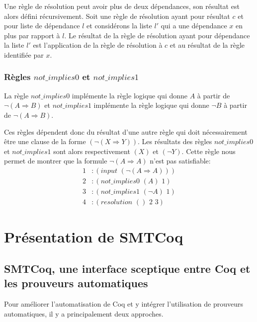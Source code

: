 \documentclass[11pt]{article}
\begin{document}
Une règle de résolution peut avoir plus de deux dépendances, son résultat est alors défini récursivement. Soit une règle de résolution ayant pour résultat $c$ et pour liste de dépendance $l$ et considérons la liste $l'$ qui a une dépendance $x$ en plus par rapport à $l$. Le résultat de la règle de résolution ayant pour dépendance la liste $l'$ est l'application de la règle de résolution à $c$ et au résultat de la règle identifiée par $x$.


\subsubsection{Règles $not\_implies0$ et $not\_implies1$} \label{not_implies}
La règle $not\_implies0$ implémente la règle logique qui donne $A$ à partir de $\neg (A \Rightarrow B)$ et $not\_implies1$ implémente la règle logique qui donne $\neg B$ à partir de $\neg (A \Rightarrow B)$. \medbreak

Ces règles dépendent donc du résultat d'une autre règle qui doit nécessairement être une clause de la forme $(\neg (X \Rightarrow Y))$. Les résultats des règles $not\_implies0$ et $not\_implies1$ sont alors respectivement $(X)$ et $(\neg Y)$. Cette règle nous permet de montrer que la formule $\neg (A \Rightarrow A)$ n'est pas satisfiable:
\begin{align*}
  1&:(input\,\, (\neg ( A \Rightarrow A))) \\
  2&:(not\_implies0\,\, (A)\,\, 1) \\
  3&:(not\_implies1\,\, (\neg A) \,\,1) \\
  4&:(resolution\,\, ()\,\, 2\,\, 3)
\end{align*}


\section{Présentation de SMTCoq} \label{pres_smtcoq}

\subsection{SMTCoq, une interface sceptique entre Coq et les prouveurs automatiques}\label{sceptique_autarcique}

Pour améliorer l'automatisation de Coq et y intégrer l'utilisation de prouveurs automatiques, il y a principalement deux approches.
\end{document}
